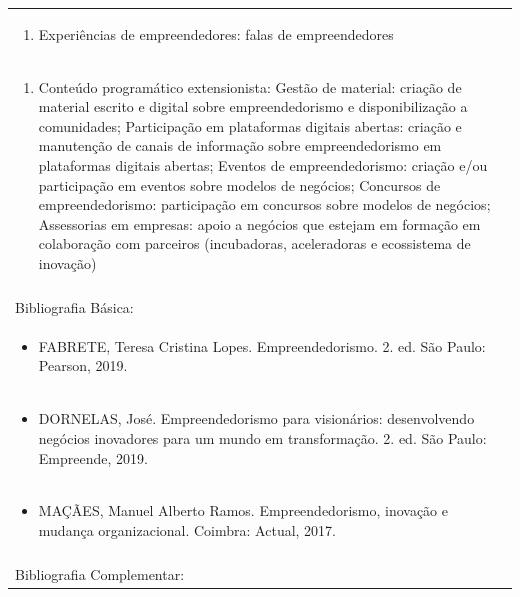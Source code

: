 \documentclass[11pt]{article}
\begin{document}
\begin{center}
\begin{longtable}{|p{4cm}|p{4cm}|p{4cm}|p{4cm}|}
\multicolumn{4}{|p{\dimexpr 16cm + 6\tabcolsep\relax}|}{\begin{enumerate}[start=6]\item Experiências de empreendedores: falas de empreendedores\end{enumerate}}\\
\multicolumn{4}{|p{\dimexpr 16cm + 6\tabcolsep\relax}|}{\begin{enumerate}[start=7]\item Conteúdo programático extensionista: Gestão de material: criação de material escrito e digital sobre empreendedorismo e disponibilização a comunidades; Participação em plataformas digitais abertas: criação e manutenção de canais de informação sobre empreendedorismo em plataformas digitais abertas; Eventos de empreendedorismo: criação e/ou participação em eventos sobre modelos de negócios; Concursos de empreendedorismo: participação em concursos sobre modelos de negócios; Assessorias em empresas: apoio a negócios que estejam em formação em colaboração com parceiros (incubadoras, aceleradoras e ecossistema de inovação)\end{enumerate}}\\
\multicolumn{4}{|p{\dimexpr 16cm + 6\tabcolsep\relax}|}{}\\
\hline
\multicolumn{4}{|p{16cm}|}{Bibliografia Básica:}\\*
\multicolumn{4}{|p{\dimexpr 16cm + 6\tabcolsep\relax}|}{\begin{itemize}\item FABRETE, Teresa Cristina Lopes. Empreendedorismo. 2. ed. São Paulo: Pearson, 2019.\end{itemize}}\\
\multicolumn{4}{|p{\dimexpr 16cm + 6\tabcolsep\relax}|}{\begin{itemize}\item DORNELAS, José. Empreendedorismo para visionários: desenvolvendo negócios inovadores para um mundo em transformação. 2. ed. São Paulo: Empreende, 2019.\end{itemize}}\\
\multicolumn{4}{|p{\dimexpr 16cm + 6\tabcolsep\relax}|}{\begin{itemize}\item MAÇÃES, Manuel Alberto Ramos. Empreendedorismo, inovação e mudança organizacional. Coimbra: Actual, 2017.\end{itemize}}\\
\multicolumn{4}{|p{16cm}|}{}\\
\hline
\multicolumn{4}{|p{16cm}|}{Bibliografia Complementar:}\\*

\end{longtable}
\end{center}
\end{document}
